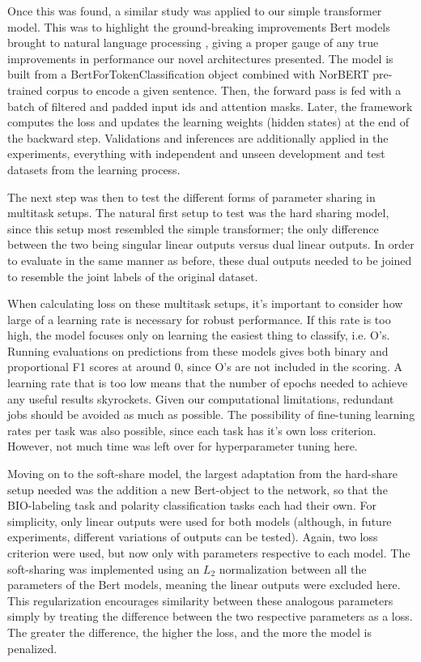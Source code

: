 \documentclass[11pt,a4paper]{article}
\begin{document}
Once this was found, a similar study was applied to our simple transformer model. This was to highlight the ground-breaking improvements Bert models brought to natural language processing \cite{devlin-etal-2019-bert}, giving a proper gauge of any true improvements in performance our novel architectures presented. The model is built from a BertForTokenClassification object combined with NorBERT pre-trained corpus to encode a given sentence. Then, the forward pass is fed with a batch of filtered and padded input ids and attention masks. Later, the framework computes the loss and updates the learning weights (hidden states) at the end of the backward step. Validations and inferences are additionally applied in the experiments, everything with independent and unseen development and test datasets from the learning process.

The next step was then to test the different forms of parameter sharing in multitask setups. The natural first setup to test was the hard sharing model, since this setup most resembled the simple transformer; the only difference between the two being singular linear outputs versus dual linear outputs. In order to evaluate in the same manner as before, these dual outputs needed to be joined to resemble the joint labels of the original dataset. 

When calculating loss on these multitask setups, it's important to consider how large of a learning rate is necessary for robust performance. If this rate is too high, the model focuses only on learning the easiest thing to classify, i.e. O's. Running evaluations on predictions from these models gives both binary and proportional F1 scores at around 0, since O's are not included in the scoring. A learning rate that is too low means that the number of epochs needed to achieve any useful results skyrockets. Given our computational limitations, redundant jobs should be avoided as much as possible. The possibility of fine-tuning learning rates per task was also possible, since each task has it's own loss criterion. However, not much time was left over for hyperparameter tuning here.  

Moving on to the soft-share model, the largest adaptation from the hard-share setup needed was the addition a new Bert-object to the network, so that the BIO-labeling task and polarity classification tasks each had their own. For simplicity, only linear outputs were used for both models (although, in future experiments, different variations of outputs can be tested). Again, two loss criterion were used, but now only with parameters respective to each model. The soft-sharing was implemented using an $L_2$ normalization between all the parameters of the Bert models, meaning the linear outputs were excluded here. This regularization encourages similarity between these analogous parameters simply by treating the difference between the two respective parameters as a loss. The greater the difference, the higher the loss, and the more the model is penalized.
\end{document}
